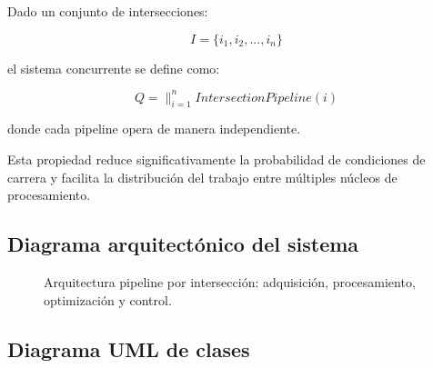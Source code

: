 \documentclass[12pt]{article}
\begin{document}
Dado un conjunto de intersecciones:

\[
I = \{i_1, i_2, ..., i_n\}
\]

el sistema concurrente se define como:

\[
Q = \parallel_{i=1}^{n} IntersectionPipeline(i)
\]

donde cada pipeline opera de manera independiente.

Esta propiedad reduce significativamente la probabilidad de condiciones de carrera y facilita la distribución del trabajo entre múltiples núcleos de procesamiento.

\subsection{Diagrama arquitectónico del sistema}

\begin{figure}[H]
\centering
{}
\caption{Arquitectura pipeline por intersección: adquisición, procesamiento, optimización y control.}
\label{fig:arch_pipeline}
\end{figure}

\subsection{Diagrama UML de clases}
\end{document}
